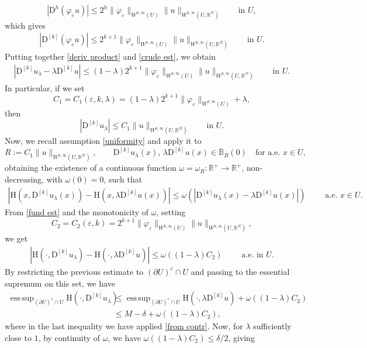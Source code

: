 \documentclass[a4paper,11pt]{article}
\numberwithin{equation}{section}
\newcommand{\numberset}{\mathbb}
\newcommand{\eps}{\varepsilon}
\newcommand{\R}{\numberset{R}}
\newcommand{\rom}{\mathrm}
\DeclareMathOperator*{\esssup}{ess\,sup}
\theoremstyle{definition}
\begin{document}
$$
|\mathrm D^h(\varphi_\eps u)|\leq 2^h\|\varphi_\eps\|_{W^{h,\infty}(U)}\|u\|_{W^{h,\infty}(U,\R^N)}\qquad \mbox{in }U, 
$$
which gives
\begin{align}\label{crude est}
|\mathrm D^{[k]}(\varphi_\eps u)|\leq 2^{k+1}\|\varphi_\eps\|_{W^{k,\infty}(U)}\|u\|_{W^{k,\infty}(U,\R^N)}\qquad \mbox{in }U.
\end{align}
Putting together \eqref{deriv product} and \eqref{crude est}, we obtain
\begin{align}\label{fund est}
|\mathrm D^{[k]}u_\lambda-\lambda \mathrm D^{[k]}u|\leq(1-\lambda)2^{k+1}\|\varphi_\eps\|_{W^{k,\infty}(U)}\|u\|_{W^{k,\infty}(U,\R^N)}\qquad\mbox{in }U.
\end{align}
In particular, if we set 
$$C_1=C_1(\eps,k,\lambda)=(1-\lambda)2^{k+1}\|\varphi_\eps\|_{W^{k,\infty}(U)}+\lambda,$$
then
$$
|\mathrm D^{[k]}u_\lambda|\leq C_1\|u\|_{W^{k,\infty}(U,\R^N)}\qquad\mbox{in }U.
$$
Now, we recall assumption \eqref{uniformity} and apply it to $$R:=C_1\|u\|_{W^{k,\infty}(U,\R^N)}, \qquad\mathrm D^{[k]}u_\lambda(x),\,\lambda\mathrm D^{[k]}u(x)\in \overline{\mathbb B}_R(0)\quad\mbox{for a.e.   }x\in U,$$
obtaining the existence of a continuous function $\omega=\omega_R:\R^+\to\R^+$, non-decreasing, with $\omega(0)=0$, such that
\begin{align*}
|\rom{H}(x,\mathrm D^{[k]}u_\lambda(x))-\rom{H}(x,\lambda\mathrm D^{[k]}u(x))|\leq \omega(|\mathrm D^{[k]}u_\lambda(x)-\lambda\mathrm D^{[k]}u(x)|)\qquad\mbox{ a.e. }x\in U.
\end{align*} 
From \eqref{fund est} and the monotonicity of $\omega$, setting
$$
C_2=C_2(\eps,k)=2^{k+1}\|\varphi_\eps\|_{W^{k,\infty}(U)}\|u\|_{W^{k,\infty}(U,\R^N)},
$$
we get
\begin{align*}
|\rom{H}(\cdot,\mathrm D^{[k]}u_\lambda)-\rom{H}(\cdot,\lambda\mathrm D^{[k]}u)|\leq \omega\left((1-\lambda)C_2\right)\qquad\mbox{ a.e. in } U.
\end{align*}
By restricting the previous estimate to $(\partial U)^\eps\cap U$ and passing to the essential supremum on this set, we have
\begin{align*}
\esssup_{(\partial U)^\eps\cap U}\rom{H}(\cdot, \mathrm D^{[k]}u_\lambda)&\leq\esssup_{(\partial U)^\eps\cap U}\rom{H}(\cdot, \lambda\mathrm D^{[k]}u)+ \omega\left((1-\lambda)C_2\right)\\
&\leq M-\delta +\omega\left((1-\lambda)C_2\right),
\end{align*}
where in the last inequality we have applied \eqref{from contr}. Now, for $\lambda$ sufficiently close to $1$, by continuity of $\omega$, we have $\omega\left((1-\lambda)C_2\right)\leq\delta/2$, giving
\end{document}
